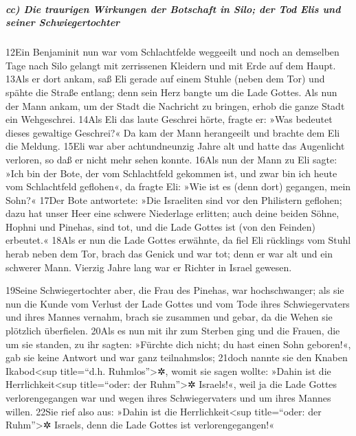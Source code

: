 \hypertarget{cc-die-traurigen-wirkungen-der-botschaft-in-silo-der-tod-elis-und-seiner-schwiegertochter}{%
\subparagraph{cc) Die traurigen Wirkungen der Botschaft in Silo; der Tod
Elis und seiner
Schwiegertochter}\label{cc-die-traurigen-wirkungen-der-botschaft-in-silo-der-tod-elis-und-seiner-schwiegertochter}}

12Ein Benjaminit nun war vom Schlachtfelde weggeeilt und noch an
demselben Tage nach Silo gelangt mit zerrissenen Kleidern und mit Erde
auf dem Haupt. 13Als er dort ankam, saß Eli gerade auf einem Stuhle
(neben dem Tor) und spähte die Straße entlang; denn sein Herz bangte um
die Lade Gottes. Als nun der Mann ankam, um der Stadt die Nachricht zu
bringen, erhob die ganze Stadt ein Wehgeschrei. 14Als Eli das laute
Geschrei hörte, fragte er: »Was bedeutet dieses gewaltige Geschrei?« Da
kam der Mann herangeeilt und brachte dem Eli die Meldung. 15Eli war aber
achtundneunzig Jahre alt und hatte das Augenlicht verloren, so daß er
nicht mehr sehen konnte. 16Als nun der Mann zu Eli sagte: »Ich bin der
Bote, der vom Schlachtfeld gekommen ist, und zwar bin ich heute vom
Schlachtfeld geflohen«, da fragte Eli: »Wie ist es (denn dort) gegangen,
mein Sohn?« 17Der Bote antwortete: »Die Israeliten sind vor den
Philistern geflohen; dazu hat unser Heer eine schwere Niederlage
erlitten; auch deine beiden Söhne, Hophni und Pinehas, sind tot, und die
Lade Gottes ist (von den Feinden) erbeutet.« 18Als er nun die Lade
Gottes erwähnte, da fiel Eli rücklings vom Stuhl herab neben dem Tor,
brach das Genick und war tot; denn er war alt und ein schwerer Mann.
Vierzig Jahre lang war er Richter in Israel gewesen.

19Seine Schwiegertochter aber, die Frau des Pinehas, war hochschwanger;
als sie nun die Kunde vom Verlust der Lade Gottes und vom Tode ihres
Schwiegervaters und ihres Mannes vernahm, brach sie zusammen und gebar,
da die Wehen sie plötzlich überfielen. 20Als es nun mit ihr zum Sterben
ging und die Frauen, die um sie standen, zu ihr sagten: »Fürchte dich
nicht; du hast einen Sohn geboren!«, gab sie keine Antwort und war ganz
teilnahmslos; 21doch nannte sie den Knaben Ikabod\textless sup
title=``d.h. Ruhmlos''\textgreater✲, womit sie sagen wollte: »Dahin ist
die Herrlichkeit\textless sup title=``oder: der Ruhm''\textgreater✲
Israels!«, weil ja die Lade Gottes verlorengegangen war und wegen ihres
Schwiegervaters und um ihres Mannes willen. 22Sie rief also aus: »Dahin
ist die Herrlichkeit\textless sup title=``oder: der Ruhm''\textgreater✲
Israels, denn die Lade Gottes ist verlorengegangen!«

